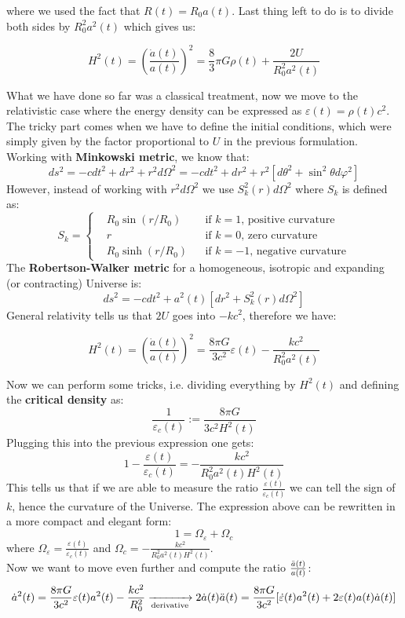\documentclass[10.75pt,a4paper,openright,bottom=2cm]{article}
\newcommand{\beginbox}[1]{\begin{tcolorbox}[width=\textwidth,colback={black!40},title={#1},colbacktitle={purple!55},coltitle=black]}
\renewcommand{\endbox}{\end{tcolorbox}\noindent}
\begin{document}
where we used the fact that $R(t)=R_0a(t)$. Last thing left to do is to divide both sides by $R_0^2a^2(t)$ which gives us:
\beginbox{Friedmann Equation (classical derivation)}
\[
H^2(t)=\left(\frac{\Dot{a}(t)}{a(t)}\right)^2=\frac{8}{3}\pi G\rho(t)+\frac{2U}{R_0^2a^2(t)}
\]
\endbox
What we have done so far was a classical treatment, now we move to the relativistic case where the energy density can be expressed as $\varepsilon(t)=\rho(t)c^2$. The tricky part comes when we have to define the initial conditions, which were simply given by the factor proportional to $U$ in the previous formulation. Working with \textbf{Minkowski metric}, we know that:
\[
ds^2=-cdt^2+dr^2+r^2d\Omega^2=-cdt^2+dr^2+r^2[d\theta^2+\sin^2\theta d\varphi^2]
\]
However, instead of working with $r^2d\Omega^2$ we use $S_k^2(r)d\Omega^2$ where $S_k$ is defined as:
\[
S_k=\left\{\begin{aligned}
&R_0\sin(r/R_0) &&\text{if $k=1$, positive curvature}\\
&r &&\text{if $k=0$, zero curvature}\\
&R_0\sinh(r/R_0) &&\text{if $k=-1$, negative curvature}
\end{aligned}\right.
\]
The \textbf{Robertson-Walker metric} for a homogeneous, isotropic and expanding (or contracting) Universe is:
\[
ds^2=-cdt^2+a^2(t)[dr^2+S_k^2(r)d\Omega^2]
\]
General relativity tells us that $2U$ goes into $-kc^2$, therefore we have:
\beginbox{Friedmann Equation (relativistic version)}
\[
H^2(t)=\left(\frac{\Dot{a}(t)}{a(t)}\right)^2=\frac{8\pi G}{3c^2}\varepsilon(t)-\frac{kc^2}{R_0^2a^2(t)}
\]
\endbox
Now we can perform some tricks, i.e. dividing everything by $H^2(t)$ and defining the \textbf{critical density} as:
\[
\frac{1}{\varepsilon_c(t)}:=\frac{8\pi G}{3c^2H^2(t)}
\]
Plugging this into the previous expression one gets:
\[
1-\frac{\varepsilon(t)}{\varepsilon_c(t)}=-\frac{kc^2}{R_0^2a^2(t)H^2(t)}
\]
This tells us that if we are able to measure the ratio $\frac{\varepsilon(t)}{\varepsilon_c(t)}$ we can tell the sign of $k$, hence the curvature of the Universe. The expression above can be rewritten in a more compact and elegant form:
\[
1=\Omega_\varepsilon+\Omega_c
\]
where $\Omega_\varepsilon=\frac{\varepsilon(t)}{\varepsilon_c(t)}$ and $\Omega_c=-\frac{kc^2}{R_0^2a^2(t)H^2(t)}$.\\
Now we want to move even further and compute the ratio $\frac{\Ddot{a}(t)}{a(t)}$:
\[
\Dot{a}^2(t)=\frac{8\pi G}{3c^2}\varepsilon(t)a^2(t)-\frac{kc^2}{R_0^2}\xrightarrow[\text{derivative}]{}2\Dot{a}(t)\Ddot{a}(t)=\frac{8\pi G}{3c^2}[\Dot{\varepsilon}(t)a^2(t)+2\varepsilon(t)a(t)\Dot{a}(t)]
\]
\end{document}
